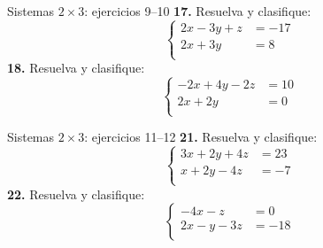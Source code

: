 \documentclass[aspectratio=169,9pt]{beamer}
\theoremstyle{remark}
\begin{document}
\begin{frame}{Sistemas $2\times 3$: ejercicios 9--10}
\small
\textbf{17.} Resuelva y clasifique:
\[\left\{\begin{aligned}
2x-3y+z&=-17\\
2x+3y&=8\\
\end{aligned}\right.\]
\textbf{18.} Resuelva y clasifique:
\[\left\{\begin{aligned}
-2x+4y-2z&=10\\
2x+2y&=0\\
\end{aligned}\right.\]
\end{frame}
\begin{frame}{Sistemas $2\times 3$: ejercicios 11--12}
\small
\textbf{21.} Resuelva y clasifique:
\[\left\{\begin{aligned}
3x+2y+4z&=23\\
x+2y-4z&=-7\\
\end{aligned}\right.\]
\textbf{22.} Resuelva y clasifique:
\[\left\{\begin{aligned}
-4x-z&=0\\
2x-y-3z&=-18\\
\end{aligned}\right.\]
\end{frame}
\end{document}
